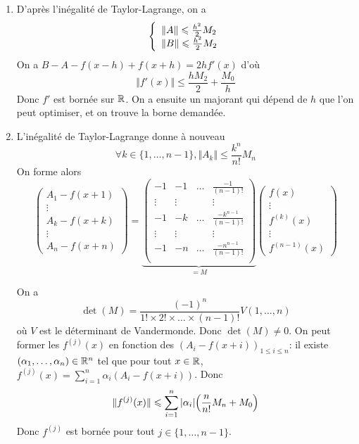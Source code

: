 \begin{solution}
	\phantom{}
	\begin{enumerate}
		\item D'après l'inégalité de Taylor-Lagrange, on a 
		$$
		\left\{
			\begin{array}[]{l}
				\Vert A\Vert\leqslant\frac{h^{2}}{2}M_{2}\\
				\Vert B\Vert\leqslant\frac{h^{2}}{2}M_{2}
			\end{array}
		\right.
		$$
		On a $B-A-f(x-h)+f(x+h)=2hf'(x)$ d'où 
		$$\Vert f'(x)\Vert\leqslant\frac{hM_{2}}{2}+\frac{M_{0}}{h}$$
		Donc $f'$ est bornée sur $\mathbb{R}$. On a ensuite un majorant qui dépend de $h$ que l'on peut optimiser, et on trouve la borne demandée.

		\item L'inégalité de Taylor-Lagrange donne à nouveau
		$$\forall k\in\{1,\dots,n-1\},\Vert A_{k}\Vert\leqslant\frac{k^{n}}{n!}M_{n}$$
		On forme alors
		$$
		\begin{pmatrix}
			A_{1}-f(x+1)\\
			\vdots\\
			A_{k}-f(x+k)\\
			\vdots\\
			A_{n}-f(x+n)
		\end{pmatrix}
		=
		\underbrace{
		\begin{pmatrix}
			-1 & -1 & \dots & \frac{-1}{(n-1)!}\\
			\vdots & \vdots & & \vdots\\
			-1 & -k & \dots & \frac{-k^{n-1}}{(n-1)!}\\
			\vdots & \vdots & & \vdots\\
			-1 & -n & \dots & \frac{-n^{n-1}}{(n-1)!}\\
		\end{pmatrix}}_{=M}
		\begin{pmatrix}
			f(x)\\
			\vdots\\
			f^{(k)}(x)\\
			\vdots\\
			f^{(n-1)}(x)
		\end{pmatrix}
		$$

		On a 
		$$\det(M)=\frac{(-1)^{n}}{1!\times 2!\times\dots\times (n-1)!}V(1,\dots,n)$$
		où $V$ est le déterminant de Vandermonde. Donc $\det(M)\neq0$. On peut former les $f^{(j)}(x)$ en fonction des $(A_{i}-f(x+i))_{1\leqslant i\leqslant n}$: il existe $(\alpha_{1},\dots,\alpha_{n})\in\mathbb{R}^{n}$ tel que pour tout $x\in\mathbb{R}$, $f^{(j)}(x)=\sum_{i=1}^{n}\alpha_{i}(A_{i}-f(x+i))$. Donc 
		$$\Vert f^{(j)}(x)\Vert\leqslant\sum_{i=1}^{n}\vert\alpha_{i}\vert\Bigl(\frac{n}{n!}M_{n}+M_{0}\Bigr)$$
		Donc $f^{(j)}$ est bornée pour tout $j\in\{1,\dots,n-1\}$.
	\end{enumerate}
\end{solution}

